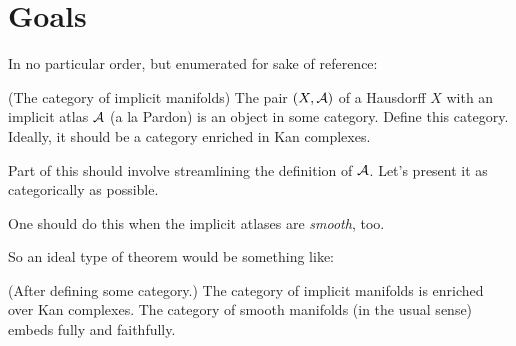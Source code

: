  

\section{Goals}
In no particular order, but enumerated for sake of reference:
\enum
	\item (The category of implicit manifolds)
		The pair $(X, \mathcal A)$ of a Hausdorff $X$ with an implicit atlas $\mathcal A$ (a la Pardon) is an object in some category. Define this category. Ideally, it should be a category enriched in Kan complexes.
			\enum
				\item
					Part of this should involve streamlining the definition of $\mathcal A$. Let's present it as categorically as possible.
				\item
					One should do this when the implicit atlases are {\em smooth}, too.
				\item
					So an ideal type of theorem would be something like:
						\begin{theorem}
						(After defining some category.) The category of implicit manifolds is enriched over Kan complexes. The category of smooth manifolds (in the usual sense) embeds fully and faithfully.
						\end{theorem}
				\item {}
				\item
